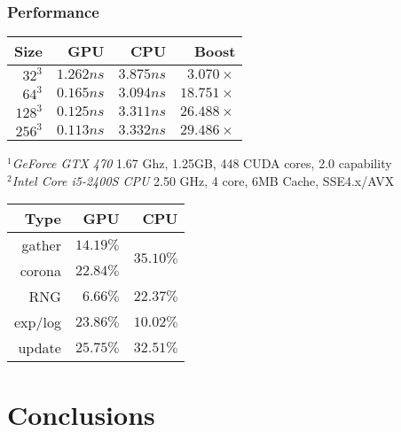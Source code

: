 \documentclass{beamer}
\begin{document}
\begin{frame} 

\frametitle{Performance}


\begin{center}
\def\arraystretch{1.1}%
\setlength{\tabcolsep}{1em}
\large
\begin{tabular}{ r r r | r }
    Size   & GPU\footnotemark & CPU\footnotemark & Boost \\
  \hline
   $32^3$  &  $1.262 ns$  &  $3.875 ns$  &  $3.070 \times$ \\
   $64^3$  &  $0.165 ns$  &  $3.094 ns$  & $18.751 \times$ \\
  $128^3$  &  $0.125 ns$  &  $3.311 ns$  & $26.488 \times$ \\
  $256^3$  &  $0.113 ns$  &  $3.332 ns$  & $29.486 \times$
\end{tabular}
\end{center}
\vfill
\small
$^1$\emph{GeForce GTX 470} 1.67 Ghz, 1.25GB, 448 CUDA cores, 2.0 capability\\
$^2$\emph{Intel Core i5-2400S CPU} 2.50 GHz, 4 core, 6MB Cache, SSE4.x/AVX

\end{frame}




\begin{frame} 
\begin{center}
\def\arraystretch{1.1}%
\setlength{\tabcolsep}{1em}
\large
\begin{tabular}{ r r r }
  Type      &     GPU      &  CPU \\
  \hline
  gather    &  $14.19 \%$  &  \multirow{2}{*}{$35.10 \%$} \\
  corona    &  $22.84 \%$  &  \\
  RNG       &  $ 6.66 \%$  &  $22.37 \%$ \\
  exp/log   &  $23.86 \%$  &  $10.02 \%$ \\
  update    &  $25.75 \%$  &  $32.51 \%$
\end{tabular}
\end{center}


\end{frame}


\section{Conclusions}
\end{document}
